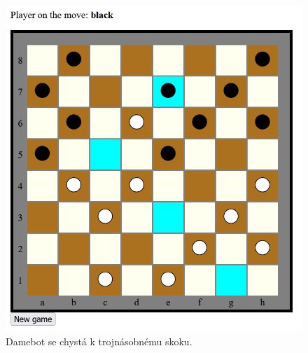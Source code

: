 \documentclass[a4paper,12pt]{article}
\begin{document}
	\begin{figure}[h]
		\centering
		\includegraphics{img/trojnasobny_skok}
		\caption{Damebot se chystá k trojnásobnému skoku.}
	\end{figure}
\end{document}
